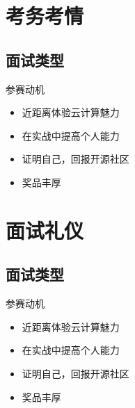 \documentclass[12pt]{beamer}
\begin{document}
\begin{CJK}{UTF8}{gkai}
\section{考务考情}
\subsection{面试类型}
\begin{frame}{参赛动机}{}
  \begin{itemize}
	\item{近距离体验云计算魅力}
  \end{itemize}
  \begin{itemize}
	\item{ 在实战中提高个人能力}
  \end{itemize}
\begin{itemize}
	\item{证明自己，回报开源社区}
  \end{itemize}
\begin{itemize}
	\item{奖品丰厚}
  \end{itemize}

\end{frame}

\section{面试礼仪}
\subsection{面试类型}
\begin{frame}{参赛动机}{}
  \begin{itemize}
	\item{近距离体验云计算魅力}
  \end{itemize}
  \begin{itemize}
	\item{ 在实战中提高个人能力}
  \end{itemize}
\begin{itemize}
	\item{证明自己，回报开源社区}
  \end{itemize}
\begin{itemize}
	\item{奖品丰厚}
  \end{itemize}

\end{frame}


\end{CJK}
\end{document}
